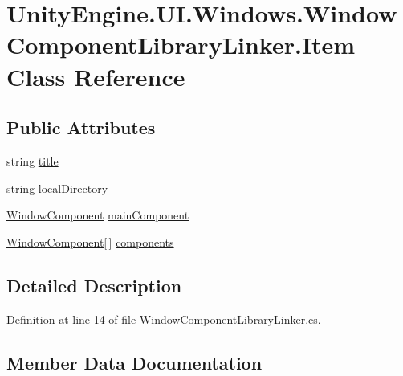 \hypertarget{class_unity_engine_1_1_u_i_1_1_windows_1_1_window_component_library_linker_1_1_item}{}\section{Unity\+Engine.\+U\+I.\+Windows.\+Window\+Component\+Library\+Linker.\+Item Class Reference}
\label{class_unity_engine_1_1_u_i_1_1_windows_1_1_window_component_library_linker_1_1_item}
\subsection*{Public Attributes}
\begin{DoxyCompactItemize}
\item 
string \hyperlink{class_unity_engine_1_1_u_i_1_1_windows_1_1_window_component_library_linker_1_1_item_afddff68f29a67d599b3a3f7da240ce48}{title}
\item 
string \hyperlink{class_unity_engine_1_1_u_i_1_1_windows_1_1_window_component_library_linker_1_1_item_aa449dab386eb65f5b773cdf5a574b49b}{local\+Directory}
\item 
\hyperlink{class_unity_engine_1_1_u_i_1_1_windows_1_1_window_component}{Window\+Component} \hyperlink{class_unity_engine_1_1_u_i_1_1_windows_1_1_window_component_library_linker_1_1_item_a62308bb1a421bb883491e309fa0d9164}{main\+Component}
\item 
\hyperlink{class_unity_engine_1_1_u_i_1_1_windows_1_1_window_component}{Window\+Component}\mbox{[}$\,$\mbox{]} \hyperlink{class_unity_engine_1_1_u_i_1_1_windows_1_1_window_component_library_linker_1_1_item_a4eccd950c48f86dcac9172ab1ae957fd}{components}
\end{DoxyCompactItemize}


\subsection{Detailed Description}


Definition at line 14 of file Window\+Component\+Library\+Linker.\+cs.



\subsection{Member Data Documentation}
\hypertarget{class_unity_engine_1_1_u_i_1_1_windows_1_1_window_component_library_linker_1_1_item_a4eccd950c48f86dcac9172ab1ae957fd}{}
